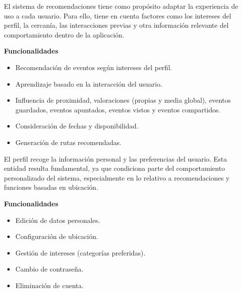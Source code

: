 \begin{tcolorbox}[title=\textbf{Recomendaciones}]
El sistema de recomendaciones tiene como propósito adaptar la experiencia de uso a cada usuario. Para ello, tiene en cuenta factores como los intereses del perfil, la cercanía, las interacciones previas y otra información relevante del comportamiento dentro de la aplicación.

\vspace{0.4em}
\textbf{Funcionalidades}
\begin{itemize}[leftmargin=1.5em]
\item Recomendación de eventos según intereses del perfil.
\item Aprendizaje basado en la interacción del usuario.
\item Influencia de proximidad, valoraciones (propias y media global), eventos guardados, eventos apuntados, eventos vistos y eventos compartidos.
\item Consideración de fechas y disponibilidad.
\item Generación de rutas recomendadas.
\end{itemize}
\end{tcolorbox}

\begin{tcolorbox}[title=\textbf{Perfil de usuario}]
El perfil recoge la información personal y las preferencias del usuario. Esta entidad resulta fundamental, ya que condiciona parte del comportamiento personalizado del sistema, especialmente en lo relativo a recomendaciones y funciones basadas en ubicación.

\vspace{0.4em}
\textbf{Funcionalidades}
\begin{itemize}[leftmargin=1.5em]
\item Edición de datos personales.
\item Configuración de ubicación.
\item Gestión de intereses (categorías preferidas).
\item Cambio de contraseña.
\item Eliminación de cuenta.
\end{itemize}
\end{tcolorbox}


